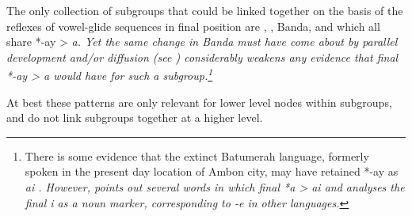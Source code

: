 
The only collection of subgroups that could be linked together
on the basis of the reflexes of vowel-glide sequences in final
position are , , Banda, and  which
all share *-ay > \it{a}.
Yet the same change in Banda must have come about by parallel
development and/or diffusion (see ) considerably weakens
any evidence that final *-ay > \it{a} would have for such a subgroup.\footnote{
		There is some evidence that the extinct Batumerah language,
		formerly spoken in the present day location of Ambon city,
		may have retained *-ay as \it{ai} \citep[138]{Stresemann1927}.
		However, \citet[86--87]{Collins1983} points out several words
		in which final *a > \it{ai}
		and analyses the final \it{i} as a noun marker,
		corresponding to \it{-e} in other  languages.}

At best these patterns are only relevant for lower level nodes
within subgroups, and do not link subgroups together at a higher level.

